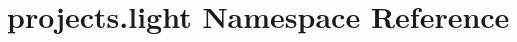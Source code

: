 \hypertarget{namespaceprojects_1_1light}{}\section{projects.\+light Namespace Reference}
\label{namespaceprojects_1_1light}
